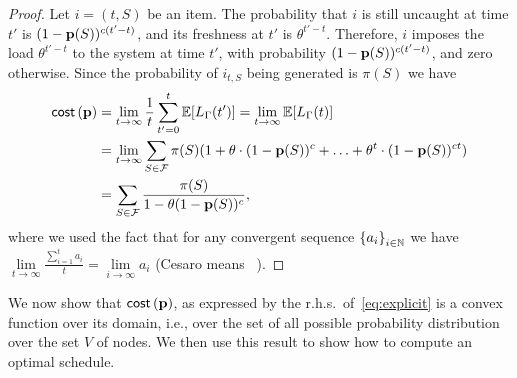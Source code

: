 \begin{proof}
	Let $i=(t, S)$ be an item. The probability that $i$ is still uncaught at
	time $t'$ is $(1-\mathbf{p}(S))^{c(t'-t)}$, and its freshness at $t'$ is $\theta^{t'
	- t}$.  Therefore, $i$ imposes the load $\theta^{t'-t}$ to the system at
	time $t'$, with probability $(1-\mathbf{p}(S))^{c(t'-t)}$, and zero otherwise. Since
	the probability of $i_{t,S}$ being generated is $\pi(S)$ we have 
	\begin{align*}
		\mathsf{cost}\left( \mathbf{p} \right) &=
		\lim_{t\rightarrow\infty}\frac{1}{t}\sum_{t'=0}^t\mathbb{E}[L_{\Gamma}(t')] =
		\lim_{t\rightarrow \infty} \mathbb{E}[L_{\Gamma}(t)] \\
		&=\lim_{t\rightarrow \infty} \sum_{S\in \mathcal{F}} \pi(S) (1 +
		\theta\cdot(1-\mathbf{p}(S))^c + \ldots + \theta^t\cdot(1-\mathbf{p}(S))^{ct}) \\ 
		&=
		\sum_{S\in \mathcal{F}} \frac{\pi(S)}{1-\theta(1-\mathbf{p}(S))^c},
		\end{align*}
		where we used the fact that for any convergent sequence
		$\left\{a_i\right\}_{i\in\mathbb{N}}$ we have
		$\lim\limits_{t\rightarrow\infty}\frac{\sum_{i=1}^t a_i}{t} =
		\lim\limits_{i\rightarrow\infty}a_i$ (Cesaro
		means~\cite{hardy1991divergent} ).
\end{proof}

We now show that $\mathsf{cost}\left( \mathbf{p} \right)$, as expressed by the r.h.s.~of~\eqref{eq:explicit}
is a convex function over its domain, i.e., over the set of all possible
probability distribution over the set $V$ of nodes. We then use this result to
show how to compute an optimal schedule.

